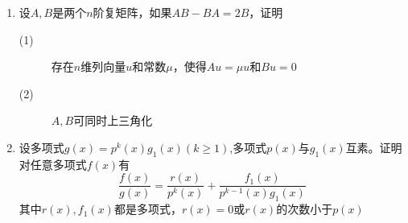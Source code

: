 \begin{enumerate}
\item 设$A,B$是两个$n$阶复矩阵，如果$AB-BA = 2B$，证明
\begin{description}
\item[(1)]存在$n$维列向量$u$和常数$\mu$，使得$Au = \mu u $和$Bu = 0$
\item[(2)]$A,B$可同时上三角化
\end{description}

\item 设多项式$g(x)=p^k(x)g_1(x)(k\geq1)$,多项式$p(x)$与$g_1(x)$互素。证明对任意多项式$f(x)$有
\[
\frac{f(x)}{g(x)} = \frac{r(x)}{p^k(x)} + \frac{f_1(x)}{p^{k-1}(x)g_1(x)}
\]
其中$r(x),f_1(x)$都是多项式，$r(x)=0$或$r(x)$的次数小于$p(x)$
\end{enumerate}